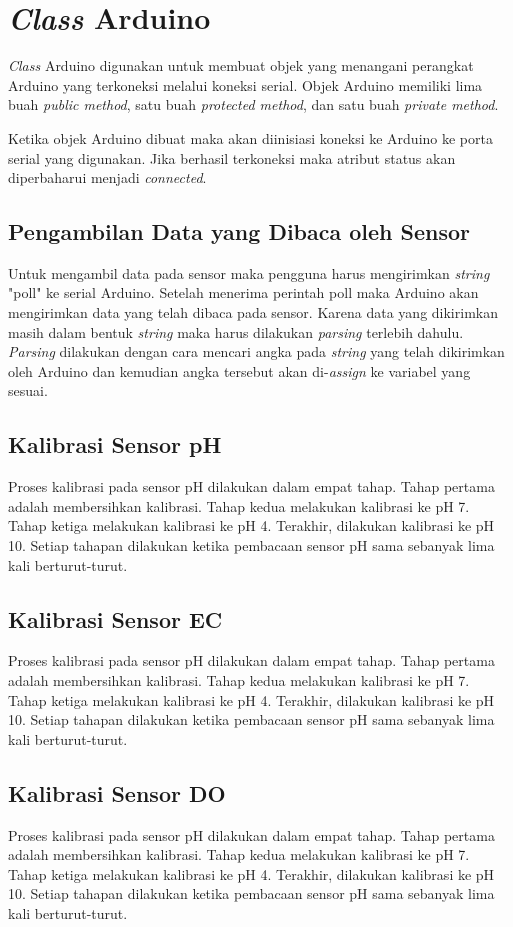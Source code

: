 \section{\textit{Class} Arduino}
\textit{Class} Arduino digunakan untuk membuat objek yang menangani perangkat Arduino yang terkoneksi melalui koneksi serial. Objek Arduino memiliki lima buah \textit{public method}, satu buah \textit{protected method}, dan satu buah \textit{private method}.

Ketika objek Arduino dibuat maka akan diinisiasi koneksi ke Arduino ke porta serial yang digunakan. Jika berhasil terkoneksi maka atribut status akan diperbaharui menjadi \textit{connected}.

\subsection{Pengambilan Data yang Dibaca oleh Sensor}
Untuk mengambil data pada sensor maka pengguna harus mengirimkan \textit{string} "poll" ke serial Arduino. Setelah menerima perintah poll maka Arduino akan mengirimkan data yang telah dibaca pada sensor. Karena data yang dikirimkan masih dalam bentuk \textit{string} maka harus dilakukan \textit{parsing} terlebih dahulu. \textit{Parsing} dilakukan dengan cara mencari angka pada \textit{string} yang telah dikirimkan oleh Arduino dan kemudian angka tersebut akan di-\textit{assign} ke variabel yang sesuai.

\subsection{Kalibrasi Sensor pH}
Proses kalibrasi pada sensor pH dilakukan dalam empat tahap. Tahap pertama adalah membersihkan kalibrasi. Tahap kedua melakukan kalibrasi ke pH 7. Tahap ketiga melakukan kalibrasi ke pH 4. Terakhir, dilakukan kalibrasi ke pH 10. Setiap tahapan dilakukan ketika pembacaan sensor pH sama sebanyak lima kali berturut-turut.

\subsection{Kalibrasi Sensor EC}
Proses kalibrasi pada sensor pH dilakukan dalam empat tahap. Tahap pertama adalah membersihkan kalibrasi. Tahap kedua melakukan kalibrasi ke pH 7. Tahap ketiga melakukan kalibrasi ke pH 4. Terakhir, dilakukan kalibrasi ke pH 10. Setiap tahapan dilakukan ketika pembacaan sensor pH sama sebanyak lima kali berturut-turut.

\subsection{Kalibrasi Sensor DO}
Proses kalibrasi pada sensor pH dilakukan dalam empat tahap. Tahap pertama adalah membersihkan kalibrasi. Tahap kedua melakukan kalibrasi ke pH 7. Tahap ketiga melakukan kalibrasi ke pH 4. Terakhir, dilakukan kalibrasi ke pH 10. Setiap tahapan dilakukan ketika pembacaan sensor pH sama sebanyak lima kali berturut-turut.
			
\begin{comment}

\end{comment}
